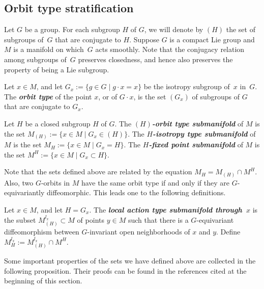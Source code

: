 \documentclass[pdftex]{sigma}
\numberwithin{equation}{section}
\newcommand{\deff}[1]{\textbf{\emph{#1}}}
\begin{document}
\subsection{Orbit type stratif\/ication}

Let $G$ be a group.  For each subgroup $H$ of $G$, we will denote by $(H)$ the set of subgroups of~$G$ that are conjugate to $H$.  Suppose $G$ is a compact Lie group and $M$ is a manifold on which~$G$ acts smoothly.  Note that the conjugacy relation among subgroups of~$G$ preserves closedness, and hence also preserves the property of being a Lie subgroup.

\begin{Definition}
Let $x \in M$, and let $G_x := \{ g \in G \mid g \cdot x = x \}$ be the isotropy subgroup of~$x$ in~$G$.  The \deff{orbit type} of the point $x$, or of $G \cdot x$, is the set $(G_x)$ of subgroups of $G$ that are conjugate to $G_x$.

Let $H$ be a closed subgroup $H$ of $G$.  The \deff{$(H)$-orbit type submanifold} of $M$ is the set $M_{(H)} := \{ x \in M \mid G_x \in (H) \}$.  The \deff{$H$-isotropy type submanifold} of $M$ is the set $M_H := \{ x \in M \mid G_x = H \}$.  The \deff{$H$-fixed point submanifold} of $M$ is the set $M^H := \{ x \in M \mid G_x \subset H \}$.
\end{Definition}

Note that the sets def\/ined above are related by the equation $M_H = M_{(H)} \cap M^H$.
Also, two $G$-orbits in $M$ have the same orbit type if and only if they are $G$-equivariantly dif\/feomorphic.  This leads one to the following def\/initions.


\begin{Definition}
Let $x \in M$, and let $H = G_x$.  The \deff{local action type submanifold through~$x$} is the subset $M_{(H)}^{l_x} \subset M$ of points $y \in M$ such that there is a $G$-equivariant dif\/feomorphism between $G$-invariant open neighborhoods of $x$ and $y$.  Def\/ine $M_H^{l_x} := M_{(H)}^{l_x} \cap M^H$.
\end{Definition}


Some important properties of the sets we have def\/ined above are collected in the following proposition.  Their proofs can be found in the references cited at the beginning of this section.
\end{document}
